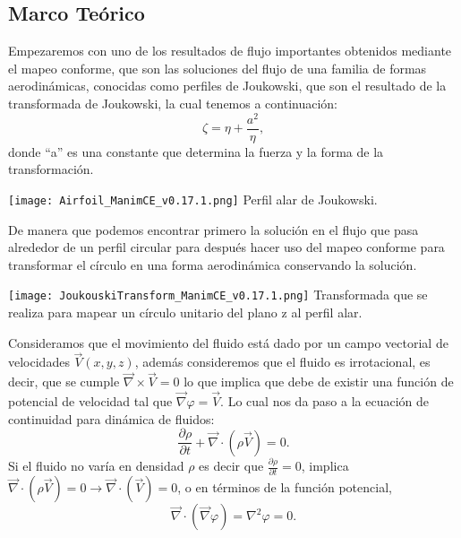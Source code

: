 \documentclass[portrait]{Hylangtechposter}
\begin{document}
\begin{multicols}{2}
\section*{Marco Teórico}
\noindent Empezaremos con uno de los resultados de flujo importantes obtenidos mediante el mapeo conforme, que son las soluciones del flujo de una familia de formas aerodinámicas, conocidas como perfiles de Joukowski, que son el resultado de la transformada de Joukowski, la cual tenemos a continuación:
\begin{equation}
    \zeta = \eta + \frac{a^2}{\eta},
\end{equation}
donde ``a'' es una constante que determina la fuerza y la forma de la transformación.
\begin{center}\vspace{0.5cm}
\texttt{[image: Airfoil\_ManimCE\_v0.17.1.png]}
 {Perfil alar de Joukowski.}
\end{center}\vspace{0.5cm}
De manera que podemos encontrar primero la solución en el flujo que pasa alrededor
de un perfil circular para después hacer uso del mapeo conforme para
transformar el círculo en una forma aerodinámica conservando la solución.
\begin{center}\vspace{0.5cm}
\texttt{[image: JoukouskiTransform\_ManimCE\_v0.17.1.png]}
 {Transformada que se realiza para mapear un círculo unitario del
plano z al perfil alar. }
\end{center}\vspace{0.5cm}
Consideramos que el movimiento del fluido está dado por un campo vectorial de velocidades $\vec{V}(x,y,z)$, además consideremos que el fluido es irrotacional, es decir, que se cumple $\vec{\nabla} \times \vec{V}=0 $ lo que implica que debe de existir una función de potencial de velocidad tal que $\vec{\nabla}\varphi = \vec{V}$. Lo cual nos da paso a la ecuación de continuidad para dinámica de fluidos:
	\begin{equation}
		\frac{\partial \rho}{\partial t} + \vec{\nabla} \cdotp (\rho \vec{V}) =0.		
	\end{equation}
 Si el fluido no varía en densidad $\rho$ es decir que $\frac{\partial \rho}{\partial t} =0 $, implica $\vec{\nabla} \cdotp (\rho \vec{V}) = 0 \longrightarrow \vec{\nabla} \cdotp (\vec{V}) =0 $, o en términos de la función potencial,
	\begin{equation}
		\vec{\nabla} \cdotp (\vec{\nabla}\varphi) = \nabla^2 \varphi =0.
	\end{equation}	 


\end{multicols}
\end{document}
